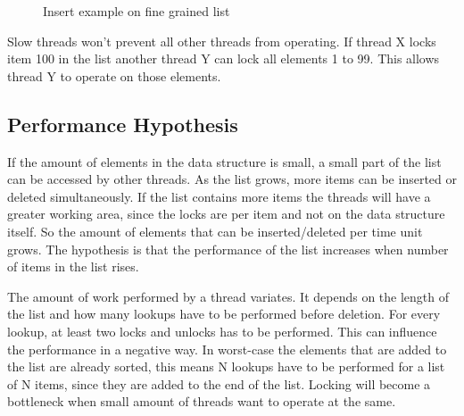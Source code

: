 \documentclass[10pt,a4paper]{article}
\begin{document}
\begin{figure}[h] 
\centerline{ 
    }
    \caption{Insert example on fine grained list}
    \label{fig:fine_insert}
\end{figure}

Slow threads won't prevent all other threads from operating. If thread X locks 
item 100 in the list another thread Y can lock all elements 1 to 99. This allows thread Y
to operate on those elements.

\subsection{Performance Hypothesis} If the amount of elements in the data
structure is small, a small part of the list can be accessed by other threads.
As the list grows, more items can be inserted or deleted simultaneously. If the
list contains more items the threads will have a greater working area, since
the locks are per item and not on the data structure itself. So the amount of
elements that can be inserted/deleted per time unit grows. The hypothesis is
that the performance of the list increases when number of items in the list
rises.

The amount of work performed by a thread variates. It depends on the length of
the list and how many lookups have to be performed before deletion. For every
lookup, at least two locks and unlocks has to be performed. This can influence
the performance in a negative way. In worst-case the elements that are added to
the list are already sorted, this means N lookups have to be performed for a
list of N items, since they are added to the end of the list. Locking will
become a bottleneck when small amount of threads want to operate at the same.
\end{document}
